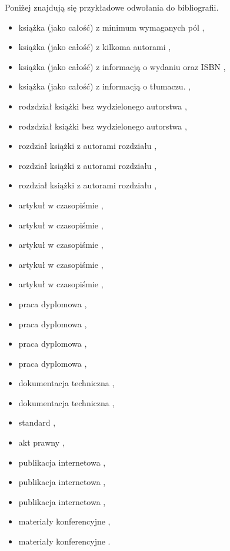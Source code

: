 \noindent Poniżej znajdują się przykładowe odwołania do bibliografii. 


\begin{itemize} \footnotesize
    \item książka (jako całość) z minimum wymaganych pól \cite{Gorski2023},
    \item książka (jako całość) z kilkoma autorami \cite{Kurczab2016},
    \item książka (jako całość) z informacją o wydaniu oraz ISBN \cite{Rowling2000},
    \item książka (jako całość) z informacją o tłumaczu. \cite{AlKhalili2022},
    \item rodzdział książki bez wydzielonego autorstwa \cite{Smith2018},
    \item rodzdział książki bez wydzielonego autorstwa \cite{Peterson2019},
    \item rozdział książki z autorami rozdziału \cite{Kraus2010},
    \item rozdział książki z autorami rozdziału \cite{Isidori2023},
    \item rozdział książki z autorami rozdziału \cite{Gregerson2010},
    \item artykuł w czasopiśmie \cite{Nowak2023},
    \item artykuł w czasopiśmie \cite{Xu2023},
    \item artykuł w czasopiśmie \cite{Mashatan2007},
    \item artykuł w czasopiśmie \cite{Hwang2006},
    \item artykuł w czasopiśmie \cite{Joye2007},
    \item praca dyplomowa \cite{Cwik2018},
    \item praca dyplomowa \cite{Marszalek2023},
    \item praca dyplomowa \cite{Urbanski2023},
    \item praca dyplomowa \cite{Otto2004},
    \item dokumentacja techniczna \cite{LPC2212},
    \item dokumentacja techniczna \cite{NIST-SP-800-22},
    \item standard \cite{FIPS140-2},
    \item akt prawny \cite{ust2001-09-18},
    \item publikacja internetowa \cite{Schneier2017},
    \item publikacja internetowa \cite{Craddock2017},
    \item publikacja internetowa \cite{MatlabPerformance2015},
    \item materiały konferencyjne \cite{Duckworth2019},
    \item materiały konferencyjne \cite{Jun2006}.
\end{itemize}

